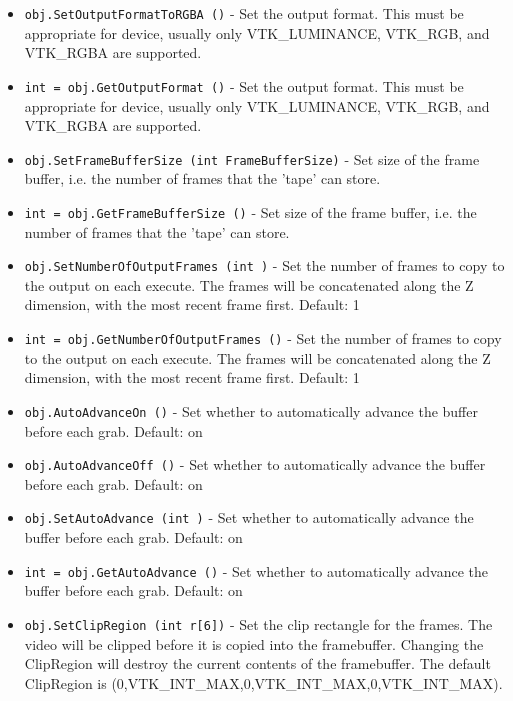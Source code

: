 \begin{itemize}
\item  \verb|obj.SetOutputFormatToRGBA ()| -  Set the output format.  This must be appropriate for device,
 usually only VTK\_LUMINANCE, VTK\_RGB, and VTK\_RGBA are supported.

\item  \verb|int = obj.GetOutputFormat ()| -  Set the output format.  This must be appropriate for device,
 usually only VTK\_LUMINANCE, VTK\_RGB, and VTK\_RGBA are supported.

\item  \verb|obj.SetFrameBufferSize (int FrameBufferSize)| -  Set size of the frame buffer, i.e. the number of frames that
 the 'tape' can store.

\item  \verb|int = obj.GetFrameBufferSize ()| -  Set size of the frame buffer, i.e. the number of frames that
 the 'tape' can store.

\item  \verb|obj.SetNumberOfOutputFrames (int )| -  Set the number of frames to copy to the output on each execute.
 The frames will be concatenated along the Z dimension, with the 
 most recent frame first.
 Default: 1

\item  \verb|int = obj.GetNumberOfOutputFrames ()| -  Set the number of frames to copy to the output on each execute.
 The frames will be concatenated along the Z dimension, with the 
 most recent frame first.
 Default: 1

\item  \verb|obj.AutoAdvanceOn ()| -  Set whether to automatically advance the buffer before each grab. 
 Default: on

\item  \verb|obj.AutoAdvanceOff ()| -  Set whether to automatically advance the buffer before each grab. 
 Default: on

\item  \verb|obj.SetAutoAdvance (int )| -  Set whether to automatically advance the buffer before each grab. 
 Default: on

\item  \verb|int = obj.GetAutoAdvance ()| -  Set whether to automatically advance the buffer before each grab. 
 Default: on

\item  \verb|obj.SetClipRegion (int r[6])| -  Set the clip rectangle for the frames.  The video will be clipped 
 before it is copied into the framebuffer.  Changing the ClipRegion
 will destroy the current contents of the framebuffer.
 The default ClipRegion is (0,VTK\_INT\_MAX,0,VTK\_INT\_MAX,0,VTK\_INT\_MAX).


\end{itemize}
